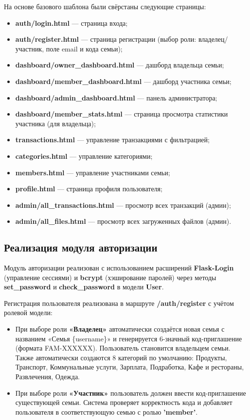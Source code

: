 На основе базового шаблона были свёрстаны следующие страницы:
\begin{itemize}
    \item \textbf{auth/login.html} --- страница входа;
    \item \textbf{auth/register.html} --- страница регистрации (выбор роли: владелец/участник, поле email и кода семьи);
    \item \textbf{dashboard/owner\_dashboard.html} --- дашборд владельца семьи;
    \item \textbf{dashboard/member\_dashboard.html} --- дашборд участника семьи;
    \item \textbf{dashboard/admin\_dashboard.html} --- панель администратора;
    \item \textbf{dashboard/member\_stats.html} --- страница просмотра статистики участника (для владельца);
    \item \textbf{transactions.html} --- управление транзакциями с фильтрацией;
    \item \textbf{categories.html} --- управление категориями;
    \item \textbf{members.html} --- управление участниками семьи;
    \item \textbf{profile.html} --- страница профиля пользователя;
    \item \textbf{admin/all\_transactions.html} --- просмотр всех транзакций (админ);
    \item \textbf{admin/all\_files.html} --- просмотр всех загруженных файлов (админ).
\end{itemize}


\subsection{Реализация модуля авторизации}

Модуль авторизации реализован с использованием расширений \textbf{Flask-Login} (управление сессиями) и \textbf{bcrypt} (хэширование паролей) через методы \textbf{set\_password} и \textbf{check\_password} в модели \textbf{User}.

Регистрация пользователя реализована в маршруте \textbf{/auth/register} с учётом ролевой модели:
\begin{itemize}
    \item При выборе роли \textbf{«Владелец»} автоматически создаётся новая семья с названием «Семья \{username\}» и генерируется 6-значный код-приглашение (формата FAM-XXXXXX). Пользователь становится владельцем семьи. Также автоматически создаются 8 категорий по умолчанию: Продукты, Транспорт, Коммунальные услуги, Зарплата, Подработка, Кафе и рестораны, Развлечения, Одежда.
    \item При выборе роли \textbf{«Участник»} пользователь должен ввести код-приглашение существующей семьи. Система проверяет корректность кода и добавляет пользователя в соответствующую семью с ролью \textbf{'member'}.
\end{itemize}

